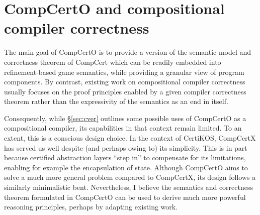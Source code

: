\documentclass[11pt,oneside]{book}
\theoremstyle{definition}
\begin{document}

\section{CompCertO and compositional compiler correctness}

The main goal of CompCertO
is to provide a version of
the semantic model and correctness theorem of CompCert
which can be readily embedded into
refinement-based game semantics,
while providing a granular view of
program components.
By contrast,
existing work on compositional compiler correctness
usually focuses on the proof principles enabled by
a given compiler correctness theorem
rather than the expressivity of the semantics
as an end in itself.

Consequently,
while \S\ref{sec:cver}
outlines some possible uses of CompCertO as a compositional compiler,
its capabilities in that context remain limited.
To an extent, this is a conscious design choice.
In the context of CertiKOS,
CompCertX has served us well
despite (and perhaps owing to) its simplicity.
This is in part because certified abstraction layers
``step in'' to compensate for its limitations,
enabling for example the encapsulation of state.
Although CompCertO aims to solve
a much more general problem compared to CompCertX,
its design follows a similarly minimalistic bent.
Nevertheless,
I believe the semantics and correctness theorem
formulated in CompCertO
can be used to derive much more powerful
reasoning principles,
perhaps by adapting existing work.
\end{document}
